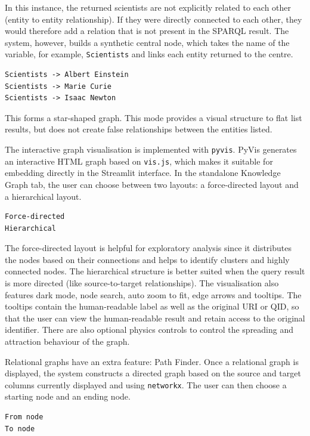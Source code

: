 \documentclass[11pt,a4paper]{article}
\begin{document}
In this instance, the returned scientists are not explicitly related to each other (entity to entity relationship). If they were directly connected to each other, they would therefore add a relation that is not present in the SPARQL result. The system, however, builds a synthetic central node, which takes the name of the variable, for example, \texttt{Scientists} and links each entity returned to the centre.

\begin{lstlisting}[style=plainStyle]
Scientists -> Albert Einstein
Scientists -> Marie Curie
Scientists -> Isaac Newton
\end{lstlisting}

This forms a star-shaped graph. This mode provides a visual structure to flat list results, but does not create false relationships between the entities listed.

The interactive graph visualisation is implemented with \texttt{pyvis}. PyVis generates an interactive HTML graph based on \texttt{vis.js}, which makes it suitable for embedding directly in the Streamlit interface. In the standalone Knowledge Graph tab, the user can choose between two layouts: a force-directed layout and a hierarchical layout.

\begin{lstlisting}[style=plainStyle]
Force-directed
Hierarchical
\end{lstlisting}

The force-directed layout is helpful for exploratory analysis since it distributes the nodes based on their connections and helps to identify clusters and highly connected nodes. The hierarchical structure is better suited when the query result is more directed (like source-to-target relationships). The visualisation also features dark mode, node search, auto zoom to fit, edge arrows and tooltips. The tooltips contain the human-readable label as well as the original URI or QID, so that the user can view the human-readable result and retain access to the original identifier. There are also optional physics controls to control the spreading and attraction behaviour of the graph.

Relational graphs have an extra feature: Path Finder. Once a relational graph is displayed, the system constructs a directed graph based on the source and target columns currently displayed and using \texttt{networkx}. The user can then choose a starting node and an ending node.

\begin{lstlisting}[style=plainStyle]
From node
To node
\end{lstlisting}
\end{document}
